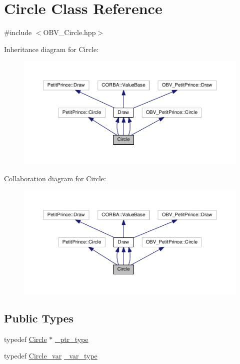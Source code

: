 \hypertarget{class_circle}{}\section{Circle Class Reference}
\label{class_circle}


{\ttfamily \#include $<$O\+B\+V\+\_\+\+Circle.\+hpp$>$}



Inheritance diagram for Circle\+:
\nopagebreak
\begin{figure}[H]
\begin{center}
\leavevmode
\includegraphics[width=350pt]{class_circle__inherit__graph}
\end{center}
\end{figure}


Collaboration diagram for Circle\+:
\nopagebreak
\begin{figure}[H]
\begin{center}
\leavevmode
\includegraphics[width=350pt]{class_circle__coll__graph}
\end{center}
\end{figure}
\subsection*{Public Types}
\begin{DoxyCompactItemize}
\item 
typedef \hyperlink{class_circle}{Circle} $\ast$ \hyperlink{class_circle_ae284325f0ac7647d6e137e8a3f507f38}{\+\_\+ptr\+\_\+type}
\item 
typedef \hyperlink{_petit_prince_8hpp_ac2106cf1632c65be064ea3929f62047b}{Circle\+\_\+var} \hyperlink{class_circle_a193392939eca82b9195367ac5be1461a}{\+\_\+var\+\_\+type}
\end{DoxyCompactItemize}
